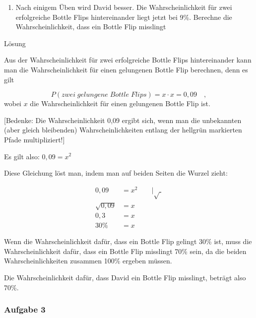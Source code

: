 \documentclass[
  ngerman,
]{book}
\providecommand{\tightlist}{%
  \setlength{\itemsep}{0pt}\setlength{\parskip}{0pt}}
\begin{document}
\begin{enumerate}
\def\labelenumi{\alph{enumi})}
\setcounter{enumi}{4}
\tightlist
\item
  Nach einigem Üben wird David besser. Die Wahrscheinlichkeit für zwei erfolgreiche Bottle Flips hintereinander liegt jetzt bei 9\%. Berechne die Wahrscheinlichkeit, dass ein Bottle Flip misslingt
\end{enumerate}

Lösung

Aus der Wahrscheinlichkeit für zwei erfolgreiche Bottle Flips hintereinander kann man die Wahrscheinlichkeit für einen gelungenen Bottle Flip berechnen, denn es gilt

\[P(zwei\;gelungene\;Bottle\;Flips) = x \cdot x  = 0,09\quad,\]
wobei \(x\) die Wahrscheinlichkeit für einen gelungenen Bottle Flip ist.

{[}Bedenke: Die Wahrscheinlichkeit 0,09 ergibt sich, wenn man die unbekannten (aber gleich bleibenden) Wahrscheinlichkeiten entlang der hellgrün markierten Pfade multipliziert!{]}

Es gilt also: \(0,09 = x^2\)

Diese Gleichung löst man, indem man auf beiden Seiten die Wurzel zieht:

\[\begin{align} 0,09 & = x^2 \quad\quad|\sqrt{\;}\\
\sqrt{0,09} &= x \\
0,3 &= x \\
30\% &= x
\end{align}\]

Wenn die Wahrscheinlichkeit dafür, dass ein Bottle Flip gelingt 30\% ist, muss die Wahrscheinlichkeit dafür, dass ein Bottle Flip misslingt 70\% sein, da die beiden Wahrscheinlichkeiten zusammen 100\% ergeben müssen.

Die Wahrscheinlichkeit dafür, dass David ein Bottle Flip misslingt, beträgt also 70\%.

\hypertarget{section-148}{%
\subsubsection*{}\label{section-148}}

\hypertarget{aufgabe-3-9}{%
\subsubsection*{Aufgabe 3}\label{aufgabe-3-9}}
\end{document}
